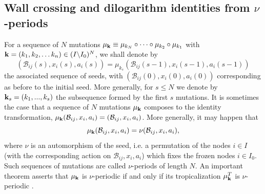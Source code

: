 \documentclass[12pt,reqno]{article}
\numberwithin{equation}{section}
\newcommand{\be}{\begin{equation}}
\newcommand{\ee}{\end{equation}}
\newcommand{\bfk}{{\bf k}}
\newcommand{\exm}{\mathcal{B}}
\def\ind{s}
\numberwithin{equation}{section}
\begin{document}
\subsection{Wall crossing and dilogarithm identities from $\nu$-periods}
\label{nuperiod}

For a sequence of $N$ mutations
$\mu_{\bfk} \equiv \mu_{k_{N}}\circ \dots \circ \mu_{k_2} \circ \mu_{k_1}$ with
${\bf k}=(k_1,k_2, \dots k_n)\in (I\backslash I_0)^N$,
we shall denote by
\be
( \exm_{ij} (\ind),x_i(\ind),a_i(\ind))=\mu_{k_\ind}( \exm_{ij} (\ind-1),x_i(\ind-1),a_i(\ind-1))
\ee
the associated sequence of seeds, with $( \exm_{ij} (0),x_i(0),a_i(0))$ corresponding as before to the initial seed.
More generally, for $\ind\leq N$ we denote by ${\bfk}_\ind=(k_1,...,k_\ind)$ the
subsequence formed by the first $\ind$ mutations.
It is sometimes the case that a sequence of $N$ mutations
$\mu_{\bfk}$ composes to the identity transformation,
$\mu_{\bfk}( \exm_{ij} ,x_i,a_i)=( \exm_{ij} ,x_i,a_i)$.
More generally, it may happen that
\be
\mu_{\bfk}( \exm_{ij} ,x_i,a_i)=\nu( \exm_{ij} ,x_i,a_i),
\ee
where $\nu$ is an automorphism of the seed, i.e. a permutation of the nodes $i\in I$
(with the corresponding action on $ \exm_{ij} ,x_i,a_i$) which fixes the frozen nodes $i\in I_0$.
Such sequences of mutations are called $\nu$-periods of length $N$. An important theorem
asserts that $\mu_{\bfk}$ is $\nu$-periodic if and only if
its tropicalization $\mu_{\bfk}^T$  is
$\nu$-periodic \cite{Keller:2010,Plamondon:2010}.
\end{document}
